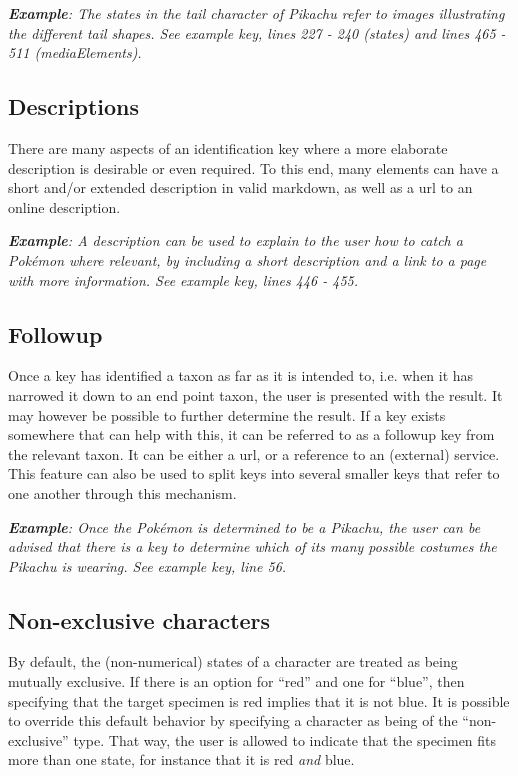 \documentclass[10pt,letterpaper]{article}
\begin{document}

\textit{\textbf{Example}: The states in the tail character of Pikachu refer to images illustrating the different tail shapes. See example key, lines 227 - 240 (states) and lines 465 - 511 (mediaElements).}
\subsection*{
Descriptions
}
There are many aspects of an identification key where a more elaborate description is desirable or even required. To this end, many elements can have a short and/or extended description in valid markdown, as well as a url to an online description.


\textit{\textbf{Example}: A description can be used to explain to the user how to catch a Pokémon where relevant, by including a short description and a link to a page with more information. See example key, lines 446 - 455.}
\subsection*{
Followup
}
Once a key has identified a taxon as far as it is intended to, i.e. when it has narrowed it down to an end point taxon, the user is presented with the result. It may however be possible to further determine the result. If a key exists somewhere that can help with this, it can be referred to as a followup key from the relevant taxon. It can be either a url, or a reference to an (external) service. This feature can also be used to split keys into several smaller keys that refer to one another through this mechanism.


\textit{\textbf{Example}: Once the Pokémon is determined to be a Pikachu, the user can be advised that there is a key to determine which of its many possible costumes the Pikachu is wearing. See example key, line 56.}
\subsection*{
Non-exclusive characters
}
By default, the (non-numerical) states of a character are treated as being mutually exclusive. If there is an option for ``red'' and one for ``blue'', then specifying that the target specimen is red implies that it is not blue. It is possible to override this default behavior by specifying a character as being of the ``non-exclusive'' type. That way, the user is allowed to indicate that the specimen fits more than one state, for instance that it is red \textit{and} blue.
\end{document}
